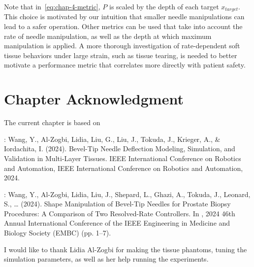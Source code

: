Note that in~\cref{eq:chap-4-metric}, $P$ is scaled by the depth of each target $x_{target}$. This choice is motivated by our intuition that smaller needle manipulations can lead to a safer operation. Other metrics can be used that take into account the rate of needle manipulation, as well as the depth at which maximum manipulation is applied. A more thorough investigation of rate-dependent soft tissue behaviors under large strain, such as tissue tearing, is needed to better motivate a performance metric that correlates more directly with patient safety. 


\section{Chapter Acknowledgment}
\label{sec:chap-4-ack}
The current chapter is based on

\parencite{wangBevelTipNeedleDeflection2024}:  Wang, Y., Al-Zogbi, Lidia, Liu, G., Liu, J., Tokuda, J., Krieger, A., \& Iordachita, I. (2024). Bevel-Tip Needle Deflection Modeling, Simulation, and Validation in Multi-Layer Tissues. IEEE International Conference on Robotics and Automation, IEEE International Conference on Robotics and Automation, 2024.

\parencite{wangShapeManipulationBevelTip2024}: Wang, Y., Al-Zogbi, Lidia, Liu, J., Shepard, L., Ghazi, A., Tokuda, J., Leonard, S., … (2024). Shape Manipulation of Bevel-Tip Needles for Prostate Biopsy Procedures: A Comparison of Two Resolved-Rate Controllers. In , 2024 46th Annual International Conference of the IEEE Engineering in Medicine and Biology Society (EMBC) (pp. 1–7).

I would like to thank Lidia Al-Zogbi for making the tissue phantoms, tuning the simulation parameters, as well as her help running the experiments.


